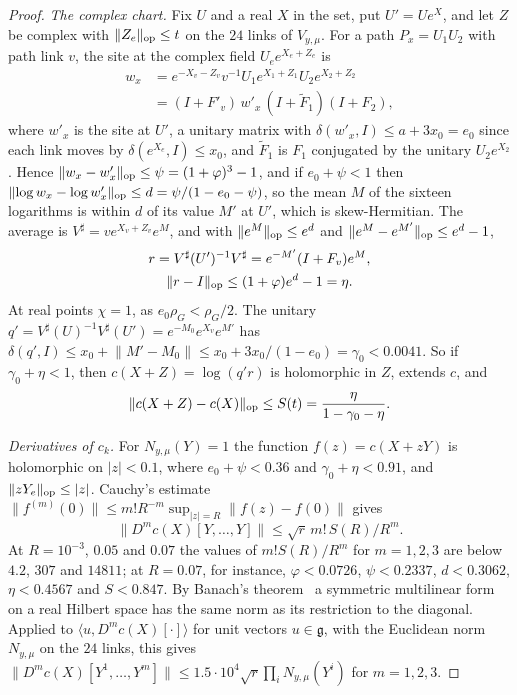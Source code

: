 \documentclass[11pt]{amsart}
\theoremstyle{definition}
\theoremstyle{remark}
\numberwithin{equation}{section}
\newcommand{\g}{\mathfrak{g}}
\begin{document}
\begin{proof}
\emph{The complex chart.} Fix $U$ and a real $X$ in the set, put $U'=
Ue^X$, and let $Z$ be complex with $\lVert Z_e\rVert_{\rm op}\le t$ on the
$24$ links of $V_{y,\mu}$. For a path $P_x=U_1U_2$ with path link $v$, the
site at the complex field $U_ee^{X_e+Z_e}$ is
\[
\begin{split}
w_x&=e^{-X_v-Z_v}v^{-1}U_1e^{X_1+Z_1}U_2e^{X_2+Z_2}\\
&=(I+F'_v)\,w'_x\,(I+\tilde F_1)(I+F_2),
\end{split}
\]
where $w'_x$ is the site at $U'$, a unitary matrix with $\delta(w'_x,I)\le
a+3x_0=e_0$ since each link moves by $\delta(e^{X_e},I)\le x_0$, and
$\tilde F_1$ is $F_1$ conjugated by the unitary $U_2e^{X_2}$. Hence $\lVert
w_x-w'_x\rVert_{\rm op}\le\psi=(1+\varphi)^3-1$, and if $e_0+\psi<1$ then
$\lVert\log w_x-\log w'_x\rVert_{\rm op}\le d=\psi/(1-e_0-\psi)$, so the
mean $M$ of the sixteen logarithms is within $d$ of its value $M'$ at
$U'$, which is skew-Hermitian. The average is $V^\sharp=ve^{X_v+Z_v}e^M$,
and with $\lVert e^M\rVert_{\rm op}\le e^d$ and $\lVert e^M-e^{M'}\rVert
_{\rm op}\le e^d-1$,
\begin{gather*}
r=V^\sharp(U')^{-1}V^\sharp=e^{-M'}(I+F_v)e^M,\\
\lVert r-I\rVert_{\rm op}\le(1+\varphi)e^d-1=\eta.
\end{gather*}
At real points $\chi=1$, as $e_0\rho_G<\rho_G/2$. The unitary $q'=V^\sharp
(U)^{-1}V^\sharp(U')=e^{-M_0}e^{X_v}e^{M'}$ has $\delta(q',I)\le x_0+\lVert
M'-M_0\rVert\le x_0+3x_0/(1-e_0)=\gamma_0<0.0041$. So if $\gamma_0+\eta<
1$, then $c(X+Z)=\log(q'r)$ is holomorphic in $Z$, extends $c$, and
\[
\lVert c(X+Z)-c(X)\rVert_{\rm op}\le S(t)=\frac\eta{1-\gamma_0-\eta}.
\]

\emph{Derivatives of $c_k$.} For $N_{y,\mu}(Y)=1$ the function $f(z)=c(X+zY)$
is holomorphic on $\lvert z\rvert<0.1$, where $e_0+\psi<0.36$ and
$\gamma_0+\eta<0.91$, and $\lVert zY_e\rVert_{\rm op}\le\lvert z\rvert$.
Cauchy's estimate $\lVert f^{(m)}(0)\rVert\le m!R^{-m}\sup_{\lvert z\rvert
=R}\lVert f(z)-f(0)\rVert$ gives
\[
\lVert D^mc(X)[Y,\dots,Y]\rVert\le\sqrt r\,m!\,S(R)/R^m .
\]
At $R=10^{-3}$, $0.05$ and $0.07$ the values of $m!S(R)/R^m$ for $m=1,2,3$
are below $4.2$, $307$ and $14811$; at $R=0.07$, for instance, $\varphi<
0.0726$, $\psi<0.2337$, $d<0.3062$, $\eta<0.4567$ and $S<0.847$. By
Banach's theorem~\cite{Ban38} a symmetric multilinear form on a real
Hilbert space has the same norm as its restriction to the diagonal. Applied
to $\langle u,D^mc(X)[\cdot]\rangle$ for unit vectors $u\in\g$, with the
Euclidean norm $N_{y,\mu}$ on the $24$ links, this gives $\lVert D^mc(X)
[Y^1,\dots,Y^m]\rVert\le1.5\cdot10^4\sqrt r\prod_iN_{y,\mu}(Y^i)$ for
$m=1,2,3$.


\end{proof}
\end{document}
